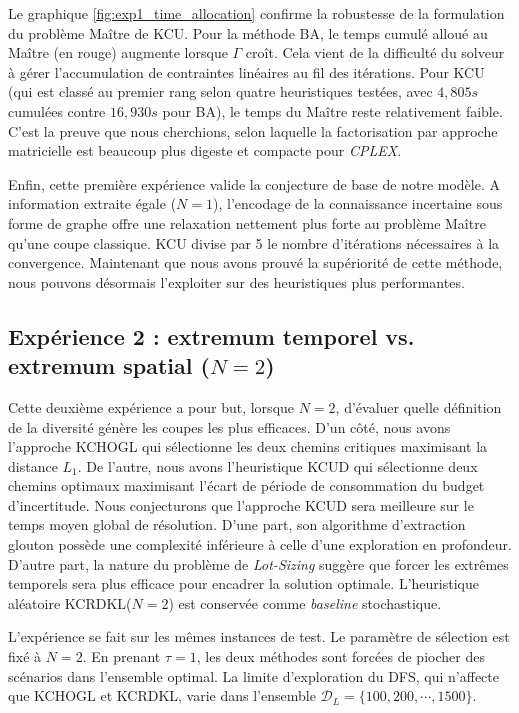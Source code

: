 \documentclass[11pt,a4paper]{article}
\begin{document}
Le graphique \ref{fig:exp1_time_allocation} confirme la robustesse de la formulation du problème Maître de KCU. Pour la méthode BA, le temps cumulé alloué au Maître (en rouge) augmente lorsque $\Gamma$ croît. Cela vient de la difficulté du solveur à gérer l'accumulation de contraintes linéaires au fil des itérations. Pour KCU (qui est classé au premier rang selon quatre heuristiques testées, avec $4,805s$ cumulées contre $16,930s$ pour BA), le temps du Maître reste relativement faible. C'est la preuve que nous cherchions, selon laquelle la factorisation par approche matricielle est beaucoup plus digeste et compacte pour \textit{CPLEX}.

Enfin, cette première expérience valide la conjecture de base de notre modèle. A information extraite égale ($N=1$), l'encodage de la connaissance incertaine sous forme de graphe offre une relaxation nettement plus forte au problème Maître qu'une coupe classique. KCU divise par 5 le nombre d'itérations nécessaires à la convergence. Maintenant que nous avons prouvé la supériorité de cette méthode, nous pouvons désormais l'exploiter sur des heuristiques plus performantes.

\subsection{Expérience 2 : extremum temporel vs. extremum spatial ($N=2$)}

Cette deuxième expérience a pour but, lorsque $N=2$, d'évaluer quelle définition de la diversité génère les coupes les plus efficaces. D'un côté, nous avons l'approche KCHOGL qui sélectionne les deux chemins critiques maximisant la distance $L_1$. De l'autre, nous avons l'heuristique KCUD qui sélectionne deux chemins optimaux maximisant l'écart de période de consommation du budget d'incertitude. Nous conjecturons que l'approche KCUD sera meilleure sur le temps moyen global de résolution. D'une part, son algorithme d'extraction glouton possède une complexité inférieure à celle d'une exploration en profondeur. D'autre part, la nature du problème de \textit{Lot-Sizing} suggère que forcer les extrêmes temporels sera plus efficace pour encadrer la solution optimale. L'heuristique aléatoire KCRDKL($N=2$) est conservée comme \textit{baseline} stochastique.

L'expérience se fait sur les mêmes instances de test. Le paramètre de sélection est fixé à $N=2$. En prenant $\tau=1$, les deux méthodes sont forcées de piocher des scénarios dans l'ensemble optimal. La limite d'exploration du DFS, qui n'affecte que KCHOGL et KCRDKL, varie dans l'ensemble $\mathcal{D}_L=\{100, 200, \cdots, 1500\}$.
\end{document}
